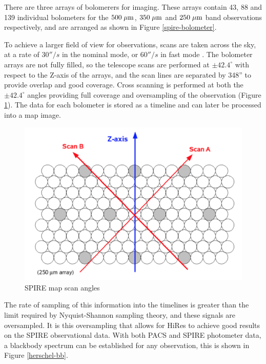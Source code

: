 There are three arrays of bolomerers for imaging. These arrays contain 43, 88 and 139 individual bolometers for the $500\;\mathrm{\mu m}$, $350\;\mathrm{\mu m}$ and $250\;\mathrm{\mu m}$ band observations respectively, and are arranged as shown in Figure \ref{spire-bolometer}.

To achieve a larger field of view for observations, scans are taken across the sky, at a rate of $30''/s$ in the nominal mode, or $60''/s$ in fast mode \citep{handbook2014herschel}. The bolometer arrays are not fully filled, so the telescope scans are performed at $\pm42.4^\circ$ with respect to the Z-axis of the arrays, and the scan lines are separated by 348'' to provide overlap and good coverage. Cross scanning is performed at both the $\pm42.4^\circ$ angles providing full coverage and oversampling of the observation (Figure \ref{scan-angles}). The data for each bolometer is stored as a timeline and can later be processed into a map image.

\begin{figure}[H]
    \centering
    \includegraphics[width=0.8\linewidth]{figures/scan-angle.png}
    \caption[SPIRE map scan angles]{SPIRE map scan angles \citep{handbook2014herschel}}
    \label{scan-angles}
\end{figure}

The rate of sampling of this information into the timelines is greater than the limit required by Nyquist-Shannon sampling theory, and these signals are oversampled. It is this oversampling that allows for HiRes to achieve good results on the SPIRE observational data. With both PACS and SPIRE photometer data, a blackbody spectrum can be established for any observation, this is shown in Figure \ref{herschel-bb}.

